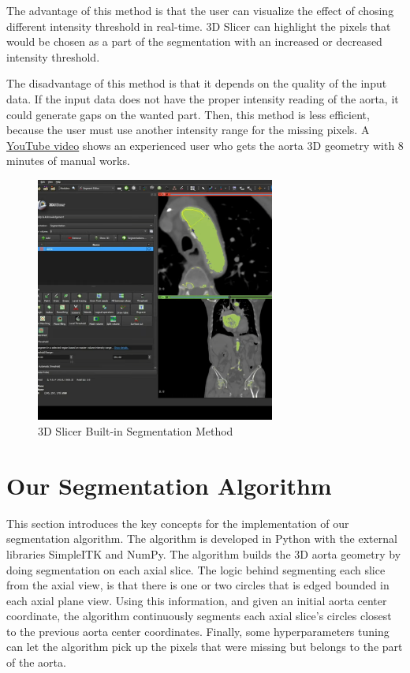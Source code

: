 The advantage of this method is that the user can visualize the effect of chosing different intensity threshold in real-time. 3D Slicer can highlight the pixels that would be chosen as a part of the segmentation with an increased or decreased intensity threshold.

The disadvantage of this method is that it depends on the quality of the input data. If the input data does not have the proper intensity reading of the aorta, it could generate gaps on the wanted part. Then, this method is less efficient, because the user must use another intensity range for the missing pixels. A \href{https://www.youtube.com/watch?v=5_673cHMBiY}{YouTube video} shows an experienced user who gets the aorta 3D geometry with 8 minutes of manual works. 

\begin{figure}[H]
    \centering
    \includegraphics[width=0.7\textwidth]{figures/Sample/3D-Slicer-Segmentation.png}
    \caption[3D Slicer Built-in Segmentation UI]{3D Slicer Built-in Segmentation Method \cite{Kikinis2014}}
    \label{fig_3D_Seg_Builtin}
\end{figure}

\section{Our Segmentation Algorithm}

This section introduces the key concepts for the implementation of our segmentation algorithm. The algorithm is developed in Python with the external libraries SimpleITK and NumPy. The algorithm builds the 3D aorta geometry by doing segmentation on each axial slice. The logic behind segmenting each slice from the axial view, is that there is one or two circles that is edged bounded in each axial plane view. Using this information, and given an initial aorta center coordinate, the algorithm continuously segments each axial slice's circles closest to the previous aorta center coordinates. Finally, some hyperparameters tuning can let the algorithm pick up the pixels that were missing but belongs to the part of the aorta.

